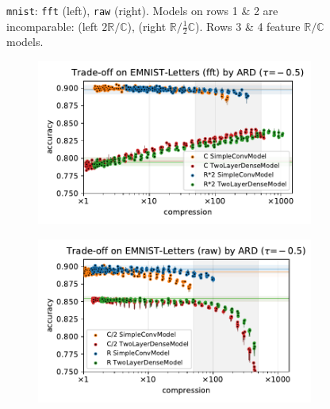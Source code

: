 \documentclass[a4paper,10pt,onecolumn]{article}
\newcommand{\real}{\mathbb{R}}
\newcommand{\cplx}{\mathbb{C}}
\begin{document}
\begin{figure}[b]
\begin{subfigure}[b]{0.5\columnwidth}
  \end{subfigure}
  \caption{%
    \texttt{mnist}:
      \texttt{fft} (left), \texttt{raw} (right).
      Models on rows 1 \& 2 are incomparable: (left $2\real / \cplx$), (right $\real / \tfrac12\cplx$).
      Rows 3 \& 4 feature $\real / \cplx$ models.
  }
\end{figure}



\begin{figure}[b]
  \centering
  \begin{subfigure}[b]{0.5\columnwidth}
    \centering
    \includegraphics[width=\columnwidth]{figure__mnist-like__trade-off/appendix__cmp__ARD__emnist_letters__fft__-0.5.pdf}
  \end{subfigure}%
  \begin{subfigure}[b]{0.5\columnwidth}
    \centering
    \includegraphics[width=\columnwidth]{figure__mnist-like__trade-off/appendix__cmp__ARD__emnist_letters__raw__-0.5.pdf}

\end{subfigure}
\end{figure}
\end{document}
